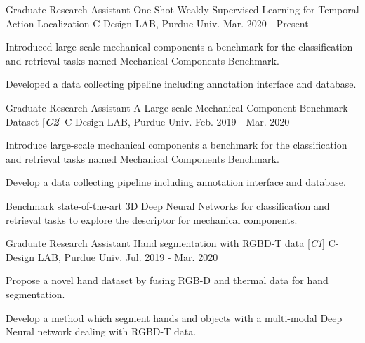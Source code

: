 

\begin{cventries}

\cventry
{Graduate Research Assistant} %
{One-Shot Weakly-Supervised Learning for Temporal Action Localization} %
{C-Design LAB, Purdue Univ.} %
{Mar. 2020 - Present} %
{ %
\begin{cvitems}
\item {Introduced large-scale mechanical components a benchmark for the classification and retrieval tasks named Mechanical Components Benchmark.}
\item {Developed a data collecting pipeline including annotation interface and database.}
\end{cvitems}
}

\cventry
{Graduate Research Assistant} %
{A Large-scale Mechanical Component Benchmark Dataset [\textit{\textbf{C2}}]} %
{C-Design LAB, Purdue Univ.} %
{Feb. 2019 - Mar. 2020} %
{ %
\begin{cvitems}
\item {Introduce large-scale mechanical components a benchmark for the classification and retrieval tasks named Mechanical Components Benchmark.}
\item {Develop a data collecting pipeline including annotation interface and database.}
\item {Benchmark state-of-the-art 3D Deep Neural Networks for classification and retrieval tasks to explore the descriptor for mechanical components.}
\end{cvitems}
}

\cventry
{Graduate Research Assistant} %
{Hand segmentation with RGBD-T data [\textit{\textit{C1}}]} %
{C-Design LAB, Purdue Univ.} %
{Jul. 2019 - Mar. 2020} %
{ %
\begin{cvitems}
\item {Propose a novel hand dataset by fusing RGB-D and thermal data for hand segmentation.}
\item {Develop a method which segment hands and objects with a multi-modal Deep Neural network dealing with RGBD-T data.}
\end{cvitems}
}


\end{cventries}
